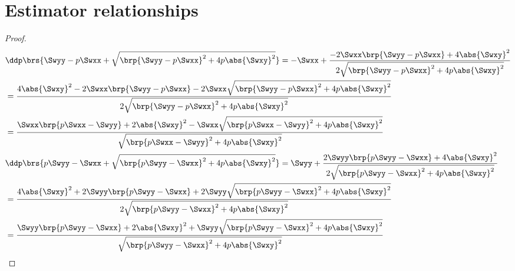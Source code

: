 \section{Estimator relationships}
\begin{lemma}
\label{lem:Hs_ddp}
\end{lemma}
\begin{proof}
  \begin{align*}
      &\ddp\brs{\Swyy-p\Swxx + \sqrt{\brp{\Swyy-p\Swxx }^2 + 4 p \abs{\Swxy}^2}}
      = -\Swxx  + \frac{-2\Swxx\brp{\Swyy-p\Swxx}   + 4 \abs{\Swxy}^2}
                        {2\sqrt{\brp{\Swyy-p\Swxx}^2 + 4p\abs{\Swxy}^2}}
    \\&= \frac{4 \abs{\Swxy }^2 -2\Swxx\brp{\Swyy-p\Swxx} - 2\Swxx\sqrt{\brp{\Swyy-p\Swxx }^2 + 4p\abs{\Swxy}^2}}
              {2\sqrt{\brp{\Swyy-p\Swxx }^2 + 4p\abs{\Swxy}^2}}
    \\&= \frac{\Swxx\brp{p\Swxx-\Swyy} + 2 \abs{\Swxy }^2 -  \Swxx\sqrt{\brp{p\Swxx-\Swyy}^2 + 4p\abs{\Swxy}^2}}
              {\sqrt{\brp{p\Swxx-\Swyy}^2 + 4p\abs{\Swxy}^2}}
    \\
      &\ddp\brs{p\Swyy-\Swxx + \sqrt{\brp{p\Swyy-\Swxx }^2 + 4 p \abs{\Swxy}^2}}
       = \Swyy  + \frac{2\Swyy\brp{p\Swyy-\Swxx}   + 4 \abs{\Swxy}^2}
                        {2\sqrt{\brp{p\Swyy-\Swxx}^2 + 4p\abs{\Swxy}^2}}
    \\&= \frac{4 \abs{\Swxy }^2 +2\Swyy\brp{p\Swyy-\Swxx} + 2\Swyy\sqrt{\brp{p\Swyy-\Swxx }^2 + 4p\abs{\Swxy}^2}}
              {2\sqrt{\brp{p\Swyy-\Swxx }^2 + 4p\abs{\Swxy}^2}}
    \\&= \frac{\Swyy\brp{p\Swyy-\Swxx} + 2 \abs{\Swxy }^2 +  \Swyy\sqrt{\brp{p\Swyy-\Swxx}^2 + 4p\abs{\Swxy}^2}}
              {\sqrt{\brp{p\Swyy-\Swxx}^2 + 4p\abs{\Swxy}^2}}
  \end{align*}
\end{proof}

